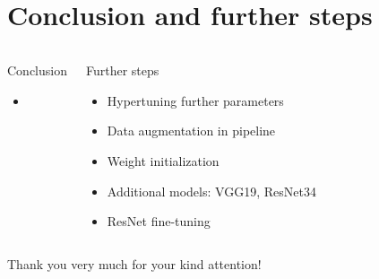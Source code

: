 \documentclass[aspectratio=169]{beamer}
\begin{document}
\section{Conclusion and further steps}
\begin{frame}{}
    \begin{columns}[T]
        \begin{block}{Conclusion}
            \begin{itemize}
                \item
            \end{itemize}
        \end{block}
        \begin{block}{Further steps}
            \begin{itemize}
                \item Hypertuning further parameters
                \item Data augmentation in pipeline
                \item Weight initialization
                \item Additional models: VGG19, ResNet34
                \item ResNet fine-tuning
            \end{itemize}
        \end{block}
    \end{columns}
\end{frame}

\begin{frame}
    \centering \Large
    Thank you very much for your kind attention!
\end{frame}
\end{document}
